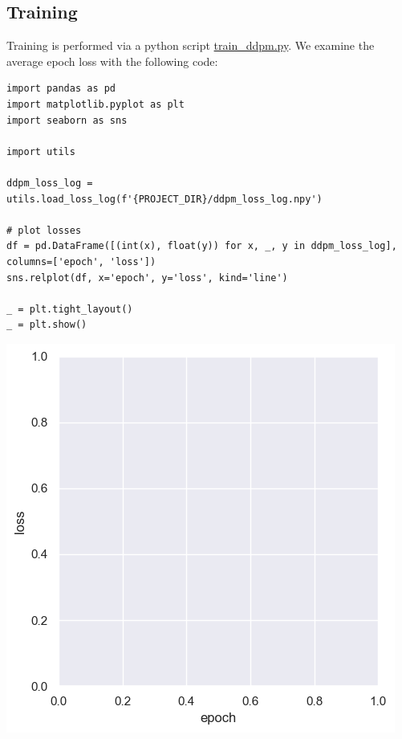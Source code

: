 \documentclass[a4paper, 11pt]{article}
\begin{document}
\subsection{Training}
\label{sec:orgeba7dc2}
Training is performed via a python script \url{train\_ddpm.py}. We examine the average epoch loss with the following code:
\begin{verbatim}
import pandas as pd
import matplotlib.pyplot as plt
import seaborn as sns

import utils

ddpm_loss_log = utils.load_loss_log(f'{PROJECT_DIR}/ddpm_loss_log.npy')

# plot losses
df = pd.DataFrame([(int(x), float(y)) for x, _, y in ddpm_loss_log], columns=['epoch', 'loss'])
sns.relplot(df, x='epoch', y='loss', kind='line')

_ = plt.tight_layout()
_ = plt.show()
\end{verbatim}

\begin{center}
\includegraphics[width=.9\linewidth]{./.ob-jupyter/5e1419e04ffa8611806495b89d9dcbfafe0c4049.png}
\end{center}
\end{document}
